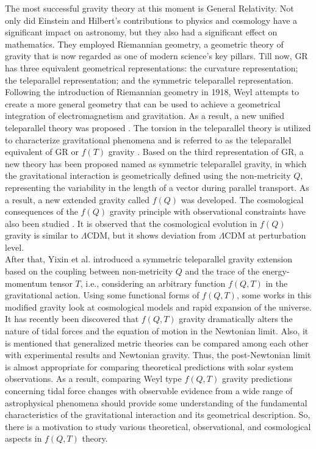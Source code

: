 The most successful gravity theory at this moment is General Relativity. Not only did Einstein and Hilbert's contributions to physics and cosmology have a significant impact on astronomy, but they also had a significant effect on mathematics. They employed Riemannian geometry, a geometric theory of gravity that is now regarded as one of modern science's key pillars. Till now, GR has three equivalent geometrical representations: the curvature representation; the teleparallel representation; and the symmetric teleparallel representation. Following the introduction of Riemannian geometry in 1918, Weyl \cite{Weyl} attempts to create a more general geometry that can be used to achieve a geometrical integration of electromagnetism and gravitation. As a result, a new unified teleparallel theory was proposed \cite{Hayashi/1979}. The torsion in the teleparallel theory is utilized to characterize gravitational phenomena and is referred to as the teleparallel equivalent of GR or $f(T)$ gravity \cite{Yi-Fu,Capozziello/2011}. Based on the third representation of GR, a new theory has been proposed \cite{Nester} named as symmetric teleparallel gravity, in which the gravitational interaction is geometrically defined using the non-metricity $Q$, representing the variability in the length of a vector during parallel transport. As a result, a new extended gravity called $f(Q)$ was developed. The cosmological consequences of the $f(Q)$ gravity principle with observational constraints have also been studied \cite{Jimenez/2018,Harko/2018,J.Lu,Lazkoz,Mandal}. It is observed that the cosmological evolution in $f(Q)$ gravity is similar to $\Lambda$CDM, but it shows deviation from $\Lambda$CDM at perturbation level\cite{Khyllep/2021}.\\
After that, Yixin et al. \cite{Yixin/2019,Yixin/2020} introduced a symmetric teleparallel gravity extension based on the coupling between non-metricity $Q$ and the trace of the energy-momentum tensor $T$, i.e., considering an arbitrary function $f(Q,T)$ in the gravitational action. Using some functional forms of $f(Q,T)$, some works in this modified gravity look at cosmological models and rapid expansion of the universe. It has recently been discovered that $f(Q, T)$ gravity dramatically alters the nature of tidal forces and the equation of motion in the Newtonian limit\cite{Yang/2021}. Also, it is mentioned that generalized metric theories can be compared among each other with experimental results and Newtonian gravity. Thus, the post-Newtonian limit is almost appropriate for comparing theoretical predictions with solar system observations. As a result, comparing Weyl type $f(Q, T)$ gravity predictions concerning tidal force changes with observable evidence from a wide range of astrophysical phenomena should provide some understanding of the fundamental characteristics of the gravitational interaction and its geometrical description. So, there is a motivation to study various theoretical, observational, and cosmological aspects in $f(Q, T)$ theory.
